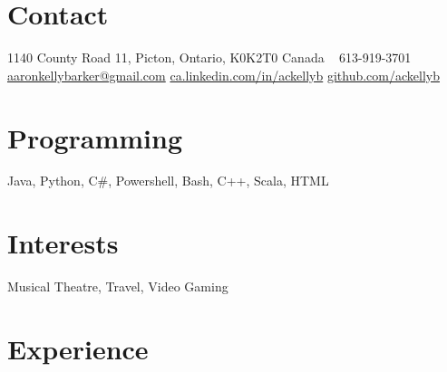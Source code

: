 \documentclass[]{friggeri-cv} %
\begin{document}



\begin{aside} %
	\section{Contact}
	1140 County Road 11, 
	Picton, Ontario,
	K0K2T0 Canada
	~
	613-919-3701
	~
	\href{mailto:aaron.kelly.barker@gmail.com}{aaronkellybarker@gmail.com}
	\href{ca.linkedin.com/in/ackellyb/}{ca.linkedin.com/in/ackellyb}
	\href{https://github.com/ackellyb}{github.com/ackellyb}
	~
	\section{Programming}
	Java, Python, C\#,
	Powershell, Bash, 
	C++, Scala, HTML
	~
	\section{Interests}
	Musical Theatre, Travel, 
	Video Gaming	
\end{aside}


\section{Experience}
\end{document}
